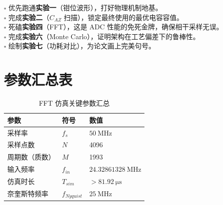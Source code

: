 \documentclass[11pt,a4paper,UTF8]{ctexart}
\begin{document}
\vspace{3ex}
\begin{tcolorbox}[colback=red!5!white,colframe=red!75!black,title=\textbf{执行 Checklist (建议勾选)}]
$\square$ 优先跑通\textbf{实验一}（钳位波形），打好物理机制地基。\\
$\square$ 完成\textbf{实验二}（$C_{AZ}$ 扫描），锁定最终使用的最优电容容值。\\
$\square$ 死磕\textbf{实验四}（FFT），这是 ADC 性能的免死金牌，确保相干采样无误。\\
$\square$ 完成\textbf{实验六}（Monte Carlo），证明架构在工艺偏差下的鲁棒性。\\
$\square$ 绘制\textbf{实验七}（功耗对比），为论文画上完美句号。
\end{tcolorbox}

\section{参数汇总表}

\begin{table}[htbp]
\centering
\caption{FFT 仿真关键参数汇总}
\label{tab:fft_params}
\begin{tabular}{lll}
\toprule
\textbf{参数} & \textbf{符号} & \textbf{数值} \\
\midrule
采样率 & $f_s$ & $\SI{50}{\mega\hertz}$ \\
采样点数 & $N$ & 4096 \\
周期数（质数） & $M$ & 1993 \\
输入频率 & $f_{in}$ & $\SI{24.32861328}{\mega\hertz}$ \\
仿真时长 & $T_{sim}$ & $>\SI{81.92}{\micro\second}$ \\
奈奎斯特频率 & $f_{Nyquist}$ & $\SI{25}{\mega\hertz}$ \\
\bottomrule
\end{tabular}
\end{table}
\end{document}
